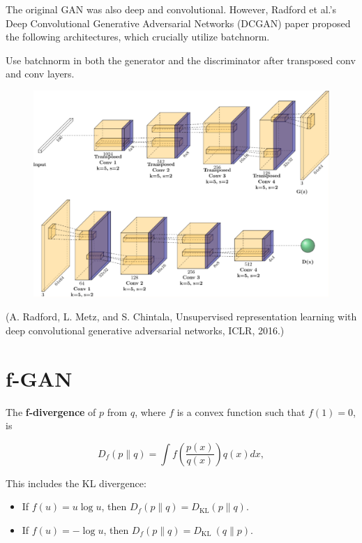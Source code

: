 \documentclass{report}
\begin{document}
\begin{definition}[12.14][DCGAN]
    The original GAN was also deep and convolutional.
    However, Radford et al.'s Deep Convolutional Generative Adversarial Networks (DCGAN) paper proposed the following architectures, which crucially utilize batchnorm.

    Use batchnorm in both the generator and the discriminator after transposed conv and conv layers.

    \begin{figure}[H]
        \centering
        \includegraphics[width=1.0\textwidth]{.././assets/12.3.png}
    \end{figure}

    (A. Radford, L. Metz, and S. Chintala, Unsupervised representation learning with deep convolutional generative adversarial networks, ICLR, 2016.)
\end{definition}

\section{f-GAN}

\begin{definition}[12.15][f-Divergence]
    The \textbf{f-divergence} of $p$ from $q$, where $f$ is a convex function such that $f(1)=0$, is

    $$
    D_{f}(p \| q)=\int f\left(\frac{p(x)}{q(x)}\right) q(x) d x,
    $$

    This includes the KL divergence:

    \begin{itemize}
        \item If $f(u)=u \log u$, then $D_{f}(p \| q)=D_{\mathrm{KL}}(p \| q)$.
        \item If $f(u)=-\log u$, then $D_{f}(p \| q)=D_{\text {KL }}(q \| p)$.
    \end{itemize}
\end{definition}
\end{document}
